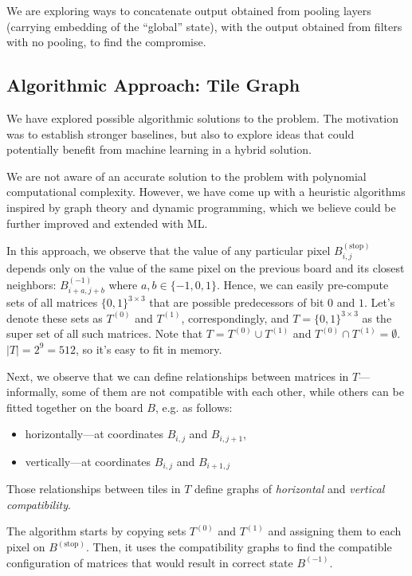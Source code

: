 \documentclass[conference]{IEEEtran}
\begin{document}
We are exploring ways to concatenate output obtained from pooling layers (carrying embedding of the ``global'' state), with the output obtained from filters with no pooling, to find the compromise.

\subsection{Algorithmic Approach: Tile Graph}
We have explored possible algorithmic solutions to the problem. The motivation was to establish stronger baselines, but also to explore ideas that could potentially benefit from machine learning in a hybrid solution.

We are not aware of an accurate solution to the problem with polynomial computational complexity. However, we have come up with a heuristic algorithms inspired by graph theory and dynamic programming, which we believe could be further improved and extended with ML.

In this approach, we observe that the value of any particular pixel $B^{(\text{stop})}_{i,j}$ depends only on the value of the same pixel on the previous board and its closest neighbors: $B^{(-1)}_{i+a,j+b}$ where $a, b \in \{-1, 0, 1\}$. Hence, we can easily pre-compute sets of all matrices $\{0, 1\}^{3\times3}$ that are possible predecessors of bit $0$ and $1$. Let's denote these sets as $T^{(0)}$ and $T^{(1)}$, correspondingly, and $T = \{0, 1\}^{3\times3}$ as the super set of all such matrices. Note that $T = T^{(0)} \cup T^{(1)}$ and $T^{(0)} \cap T^{(1)} = \emptyset$. $|T| = 2^9 = 512$, so it's easy to fit in memory.

Next, we observe that we can define relationships between matrices in $T$---informally, some of them are not compatible with each other, while others can be fitted together on the board $B$, e.g. as follows:
\begin{itemize}
    \item horizontally---at coordinates $B_{i,j}$ and $B_{i,j+1}$,
    \item vertically---at coordinates $B_{i,j}$ and $B_{i+1,j}$
\end{itemize}

Those relationships between tiles in $T$ define graphs of {\it horizontal } and {\it vertical compatibility}.

The algorithm starts by copying sets $T^{(0)}$ and $T^{(1)}$ and assigning them to each pixel on $B^{(\text{stop})}$. Then, it uses the compatibility graphs to find the compatible configuration of matrices that would result in correct state $B^{(-1)}$.
\end{document}
